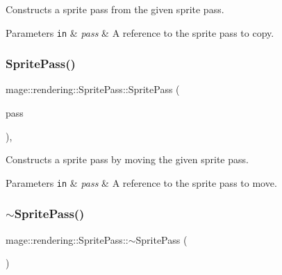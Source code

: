Constructs a sprite pass from the given sprite pass.


\begin{DoxyParams}[1]{Parameters}
\mbox{\tt in}  & {\em pass} & A reference to the sprite pass to copy. \\
\hline
\end{DoxyParams}
\hypertarget{classmage_1_1rendering_1_1_sprite_pass_ae8b938a091647c5540fa2ca8bf955556}{}\label{classmage_1_1rendering_1_1_sprite_pass_ae8b938a091647c5540fa2ca8bf955556} 
\subsubsection{\texorpdfstring{Sprite\+Pass()}{SpritePass()}\hspace{0.1cm}{\footnotesize\ttfamily [3/3]}}
{\footnotesize\ttfamily mage\+::rendering\+::\+Sprite\+Pass\+::\+Sprite\+Pass (\begin{DoxyParamCaption}\item[{\hyperlink{classmage_1_1rendering_1_1_sprite_pass}{Sprite\+Pass} \&\&}]{pass }\end{DoxyParamCaption})\hspace{0.3cm}{\ttfamily [default]}, {\ttfamily [noexcept]}}

Constructs a sprite pass by moving the given sprite pass.


\begin{DoxyParams}[1]{Parameters}
\mbox{\tt in}  & {\em pass} & A reference to the sprite pass to move. \\
\hline
\end{DoxyParams}
\hypertarget{classmage_1_1rendering_1_1_sprite_pass_ac838dec1c351d3d4f0fdcc38ef98dc1f}{}\label{classmage_1_1rendering_1_1_sprite_pass_ac838dec1c351d3d4f0fdcc38ef98dc1f} 
\subsubsection{\texorpdfstring{$\sim$\+Sprite\+Pass()}{~SpritePass()}}
{\footnotesize\ttfamily mage\+::rendering\+::\+Sprite\+Pass\+::$\sim$\+Sprite\+Pass (\begin{DoxyParamCaption}{ }\end{DoxyParamCaption})\hspace{0.3cm}{\ttfamily [default]}}


